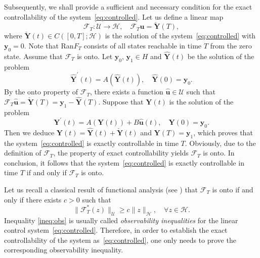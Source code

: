 \documentclass[10pt]{elsarticle}
\begin{document}
Subsequently, we shall provide a sufficient and necessary condition for the exact controllability of the system~\eqref{eq:controlled}. Let us define a linear map
\[
\mathcal{F}_{T}: \mathcal{U}\rightarrow \mathcal{H}, \quad \mathcal{F}_{T}\mathbf{ u} = \check{\mathbf{Y}}(T),
\]
where $\check{ \mathbf{Y}}(t)\in C([0, T]; \mathcal{H})$ is the solution of the system~\eqref{eq:controlled} with $\mathbf{y}_0=0$.
Note that Ran$F_T$ consists of all states reachable in time $T$ from the zero state. 
Assume that $\mathcal{F}_{T}$ is onto. Let $\mathbf{y}_0$, $\mathbf{y}_1\in {H}$ and $\widehat{\mathbf{Y}}(t)$ be the solution of the problem
\begin{equation*} 
\widehat{\mathbf{Y}}^{\prime}(t)=A(\widehat{\mathbf{Y}}(t)), \quad \widehat{\mathbf{Y}}(0)=\mathbf{y}_0. 
\end{equation*}
By the onto property of $\mathcal{F}_{T}$, there exists a function $\widehat{\mathbf{u}}\in \mathcal{U}$ such that $\mathcal{F}_{T}\widehat{\mathbf{u}} = \check{\mathbf{Y}}(T) = \mathbf{y}_1 - \widehat{\mathbf{Y}}(T)$. Suppose that $\mathbf{Y}(t)$ is the solution of the problem
\begin{equation*} 
{\mathbf{Y}}^{\prime}(t)=A(\mathbf{Y}(t))+ B\widehat{\mathbf{u}}(t), \quad \mathbf{Y}(0)=\mathbf{y}_0. 
\end{equation*}
Then we deduce $\mathbf{Y}(t) = \widehat{\mathbf{Y}}(t) + \check{ \mathbf{Y}}(t)$ and $\mathbf{Y}(T) = \mathbf{y}_1$,
which proves that the system~\eqref{eq:controlled} is exactly controllable in time $T$. Obviously, due to the definition of $\mathcal{F}_{T}$, the property of exact controllability yields $\mathcal{F}_{T}$ is onto. In conclusion, it follows that the system~\eqref{eq:controlled} is exactly controllable in time $T$ if and only if $\mathcal{F}_{T}$ is onto. 

Let us recall a classical result of functional analysis (see \cite[Theorem 4.15, pp. 97]{rudin1991functional}) that $\mathcal{F}_{T}$ is onto if and only if there exists $c>0$ such that
\begin{equation} \label{ineq:obs}
\|\mathcal{F}^{\ast}_{T}(z)\|_{\mathcal{U}} \geqslant c\|z\|_{\mathcal{H}}, \quad \forall z\in \mathcal{H}.
\end{equation}
Inequality \eqref{ineq:obs} is usually called \emph{observability inequalities} for the linear control system~\eqref{eq:controlled}. Therefore, in order to establish the exact controllability of the system as~\eqref{eq:controlled}, one only needs to prove the corresponding observability inequality.
\end{document}
